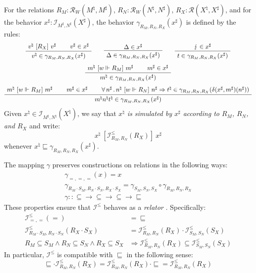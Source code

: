 \documentclass[acmsmall,timestamp,review,anonymous]{acmart}
\newcommand{\ifr}[1]{\ [{#1}]\ }
\begin{document}
\begin{definition}
For the relations $R_M : \mathcal{R}_W(M^\natural, M^\sharp)$,
$R_N : \mathcal{R}_W(N^\natural, N^\sharp)$,
$R_X : \mathcal{R}(X^\natural, X^\sharp)$, and
for the behavior $x^\sharp : \mathcal{I}_{M^\sharp, N^\sharp}(X^\sharp)$,
the behavior $\gamma_{R_M,R_N,R_X}(x^\sharp)$ is defined by the rules:
\begin{gather*}
  \AxiomC{$v^\natural \ifr{R_X} v^\sharp$}
  \AxiomC{$v^\sharp \in x^\sharp$}
  \BinaryInfC{$v^\natural \in \gamma_{R_M,R_N,R_X}(x^\sharp)$}
  \DisplayProof
  \qquad
  \AxiomC{$\Delta \in x^\sharp$}
  \UnaryInfC{$\Delta \in \gamma_{R_M,R_N,R_X}(x^\sharp)$}
  \DisplayProof
  \qquad
  \AxiomC{$\lightning \in x^\sharp$}
  \UnaryInfC{$t \in \gamma_{R_M,R_N,R_X}(x^\sharp)$}
  \DisplayProof
  \\[1ex]
  \AxiomC{$m^\natural \ifr{w \Vdash R_M} m^\sharp$}
  \AxiomC{$m^\sharp \in x^\sharp$}
  \BinaryInfC{$m^\natural \in \gamma_{R_M,R_N,R_X}(x^\sharp)$}
  \DisplayProof
  \\[1ex]
  \AxiomC{$m^\natural \ifr{w \Vdash R_M} m^\sharp$}
  \AxiomC{$m^\sharp \in x^\sharp$}
  \AxiomC{$
      \forall \, n^\sharp \,.\,
        n^\natural \ifr{w \Vdash R_N} n^\sharp \Rightarrow
        t^\natural \in \gamma_{R_M,R_N,R_X}(\delta(x^\sharp, m^\sharp)(n^\sharp))$}
  \TrinaryInfC{$m^\natural n^\natural t^\natural \in \gamma_{R_M,R_N,R_X}(x^\sharp)$}
  \DisplayProof
\end{gather*}
Given $x^\natural \in \mathcal{I}_{M^\natural,N^\natural}(X^\natural)$,
we say that
\emph{$x^\natural$ is simulated by $x^\sharp$ according to
$R_M$, $R_N$, and $R_X$} and write:
\[
    x^\natural \ifr{\mathcal{I}^\le_{R_M,R_N}(R_X)} x^\sharp
\]
whenever $x^\natural \sqsubseteq \gamma_{R_M,R_N,R_X}(x^\sharp)$.
\end{definition}

The mapping $\gamma$ preserves constructions
on relations in the following ways:
\begin{gather*}
\gamma_{=,=,=}(x) = x \\
\gamma_{R_M \cdot S_M, R_N \cdot S_N, R_X \cdot S_X} =
  \gamma_{S_M, S_N, S_X} \circ \gamma_{R_M, R_N, R_X} \\
\gamma :: {\subseteq} \rightarrow {\subseteq} \rightarrow
  {\subseteq} \rightarrow {\sqsubseteq}
\end{gather*}
These properties ensure that
$\mathcal{I}^\le$ behaves as a \emph{relator} \cite{something}.
Specifically:
\begin{align*}
  \mathcal{I}^\le_{=,=}(=) &= {\sqsubseteq} \\
  \mathcal{I}^\le_{R_M \cdot S_M, R_N \cdot S_N}(R_X \cdot S_X) &=
    \mathcal{I}^\le_{R_M, R_N}(R_X) \cdot
    \mathcal{I}^\le_{S_M, S_N}(S_X) \\
  R_M \subseteq S_M \wedge
  R_N \subseteq S_N \wedge
  R_X \subseteq S_X &\Rightarrow
    \mathcal{I}^\le_{R_M, R_N}(R_X) \subseteq
    \mathcal{I}^\le_{S_M, S_N}(S_X)
\end{align*}
In particular, $\mathcal{I}^\le$ is compatible with $\sqsubseteq$
in the following sense:
\[
    {\sqsubseteq} \cdot \mathcal{I}^\le_{R_M,R_N}(R_X) =
    \mathcal{I}^\le_{R_M,R_N}(R_X) \cdot {\sqsubseteq} =
    \mathcal{I}^\le_{R_M,R_N}(R_X)
\]
\end{document}
